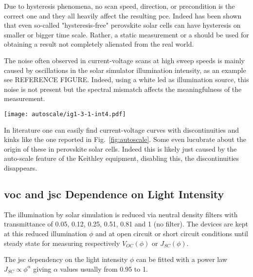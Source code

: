 			Due to hysteresis phenomena, no scan speed, direction, or precondition is the correct one and they all heavily affect the resulting \gls{pce}. Indeed has been shown that even so-called "hysteresis-free" perovskite solar cells can have hysteresis on smaller or bigger time scale\cite{Jacobs2018}. Rather, a static measurement or a  should be used for obtaining a result not completely alienated from the real world.

			The noise often observed in current-voltage scans at high sweep speeds is mainly caused by oscillations in the solar simulator illumination intensity, as an example see REFERENCE FIGURE. Indeed, using a white \gls{led} as illumination source, this noise is not present but the spectral mismatch affects the meaningfulness of the measurement.

		\label{autoscale}

			\begin{SCfigure}%
				\centering
				\texttt{[image: autoscale/ig1-3-1-int4.pdf]}
				\label{fig:autoscale}
			\end{SCfigure}

			In literature one can easily find current-voltage curves with discontinuities and kinks\cite{Li2016,Snaith2014,Zhang2015} like the one reported in Fig.~\ref{fig:autoscale}. Some even lucubrate about the origin of these in perovskite solar cells. Indeed this is likely just caused by the auto-scale feature of the Keithley equipment, disabling this, the discontinuities disappears.

	\subsection{\Gls{voc} and \gls{jsc} Dependence on Light Intensity}
		The illumination by solar simulation is reduced via neutral density filters with transmittance of 0.05, 0.12, 0.25, 0.51, 0.81 and 1 (no filter). The devices are kept at this reduced illumination $\phi$ and at open circuit or short circuit conditions until steady state for measuring respectively $V_{OC}(\phi)$ or $J_{SC}(\phi)$.
		
		\label{methods_jsc_intensity} The \gls{jsc} dependency on the light intensity $\phi$ can be fitted with a power law $J_{SC} \propto \phi^\alpha$ giving $\alpha$ values usually from 0.95 to 1.
		
